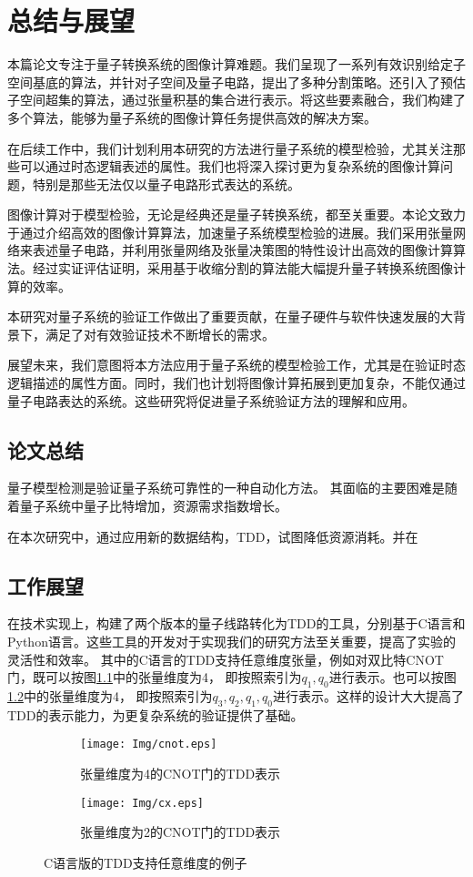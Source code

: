 \chapter{总结与展望}
本篇论文专注于量子转换系统的图像计算难题。我们呈现了一系列有效识别给定子空间基底的算法，并针对子空间及量子电路，提出了多种分割策略。还引入了预估子空间超集的算法，通过张量积基的集合进行表示。将这些要素融合，我们构建了多个算法，能够为量子系统的图像计算任务提供高效的解决方案。

在后续工作中，我们计划利用本研究的方法进行量子系统的模型检验，尤其关注那些可以通过时态逻辑表述的属性。我们也将深入探讨更为复杂系统的图像计算问题，特别是那些无法仅以量子电路形式表达的系统。

图像计算对于模型检验，无论是经典还是量子转换系统，都至关重要。本论文致力于通过介绍高效的图像计算算法，加速量子系统模型检验的进展。我们采用张量网络来表述量子电路，并利用张量网络及张量决策图的特性设计出高效的图像计算算法。经过实证评估证明，采用基于收缩分割的算法能大幅提升量子转换系统图像计算的效率。

本研究对量子系统的验证工作做出了重要贡献，在量子硬件与软件快速发展的大背景下，满足了对有效验证技术不断增长的需求。

展望未来，我们意图将本方法应用于量子系统的模型检验工作，尤其是在验证时态逻辑描述的属性方面。同时，我们也计划将图像计算拓展到更加复杂，不能仅通过量子电路表达的系统。这些研究将促进量子系统验证方法的理解和应用。
\section{论文总结}
量子模型检测是验证量子系统可靠性的一种自动化方法。
其面临的主要困难是随着量子系统中量子比特增加，资源需求指数增长。

在本次研究中，通过应用新的数据结构，TDD，试图降低资源消耗。并在
\section{工作展望}
在技术实现上，构建了两个版本的量子线路转化为TDD的工具，分别基于C语言和Python语言。这些工具的开发对于实现我们的研究方法至关重要，提高了实验的灵活性和效率。
其中的C语言的TDD支持任意维度张量，例如对双比特CNOT门，既可以按图\ref{fig:cnot-4}中的张量维度为4，
即按照索引为$q_1,q_0$进行表示。也可以按图\ref{fig:cnot-2}中的张量维度为4，
即按照索引为$q_3,q_2,q_1,q_0$进行表示。这样的设计大大提高了TDD的表示能力，为更复杂系统的验证提供了基础。
\begin{figure}[!htbp]
    \centering
    \begin{subfigure}[b]{.4\textwidth}
        \centering
        \texttt{[image: Img/cnot.eps]}
        \caption{张量维度为4的CNOT门的TDD表示}
        \label{fig:cnot-4}
    \end{subfigure}
    \begin{subfigure}[b]{.4\textwidth}
        \centering
        \texttt{[image: Img/cx.eps]}
        \caption{张量维度为2的CNOT门的TDD表示}
        \label{fig:cnot-2}
    \end{subfigure}
    \caption{C语言版的TDD支持任意维度的例子}
    \label{fig-cnot}
\end{figure}
